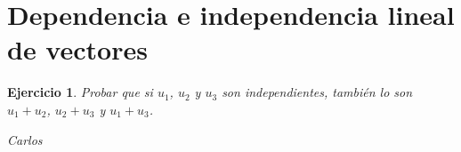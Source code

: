 \documentclass[a4paper,10pt]{book}
\newtheorem*{ejercicio}{Ejercicio}
\begin{document}
\section*{Dependencia e independencia lineal de vectores}

\begin{ejercicio}Probar que si $u_1$, $u_2$ y $u_3$ son independientes, también lo son $u_1+u_2$, $u_2+u_3$ y $u_1+u_3$.

Carlos

\end{ejercicio}
\end{document}
